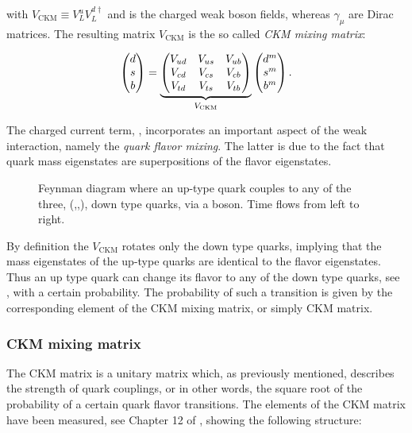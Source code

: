 \noindent with $V_{\text{CKM}} \equiv V^u_LV^{d\dagger}_L$ and \Wpm is the charged weak boson fields, whereas $\gamma_\mu$ are Dirac matrices.
The resulting matrix $V_{\text{CKM}}$ is the so called {\it CKM mixing matrix}:

\begin{equation}
  \centering
  \begin{pmatrix} \dquark \\ \squark \\ \bquark  \end{pmatrix} =
  \underbrace{\begin{pmatrix} \Vud & \Vus & \Vub \\ \Vcd & \Vcs & \Vcb \\ \Vtd & \Vts & \Vtb \end{pmatrix}}_{V_{\text{CKM}}}
    \begin{pmatrix} \dquark^m \\ \squark^m \\ \bquark^m  \end{pmatrix}.
      \label{quark_field_rotation}
  \end{equation}

The charged current term, , incorporates an important aspect of the weak interaction,
namely the {\it quark flavor mixing}. The latter is due to the fact that quark mass eigenstates are superpositions
of the flavor eigenstates.

\begin{figure}[h!]
  \centering
  {\sffamily }
  \caption{Feynman diagram where an up-type quark couples to any of the three, (\dquark,\squark,\bquark), down type quarks,
           via a \Wp boson. Time flows from left to right.}
  \label{QuarkMixing}
\end{figure}

\noindent By definition the $V_{\text{CKM}}$ rotates only the down type quarks, implying that
the mass eigenstates of the up-type quarks are identical to the flavor eigenstates. Thus an up type quark
can change its flavor to any of the down type quarks, see , with a certain probability.
The probability of such a transition is given by the corresponding element of the CKM mixing matrix, or simply CKM matrix.

\subsubsection{CKM mixing matrix}
The CKM matrix is a unitary matrix which, as previously mentioned, describes the strength of quark couplings, or in other words,
the square root of the probability of a certain quark flavor transitions. The elements of the CKM matrix have been measured,
see \eg Chapter 12 of \cite{PDG}, showing the following structure:

